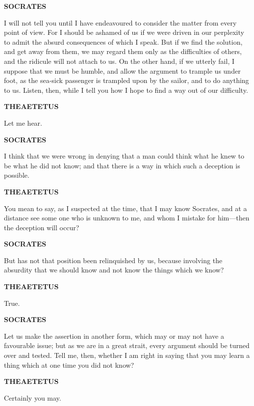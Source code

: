 \documentclass[11pt,letter]{article}
\begin{document}
\par \textbf{SOCRATES}
\par   I will not tell you until I have endeavoured to consider the matter from every point of view. For I should be ashamed of us if we were driven in our perplexity to admit the absurd consequences of which I speak. But if we find the solution, and get away from them, we may regard them only as the difficulties of others, and the ridicule will not attach to us. On the other hand, if we utterly fail, I suppose that we must be humble, and allow the argument to trample us under foot, as the sea-sick passenger is trampled upon by the sailor, and to do anything to us. Listen, then, while I tell you how I hope to find a way out of our difficulty.

\par \textbf{THEAETETUS}
\par   Let me hear.

\par \textbf{SOCRATES}
\par   I think that we were wrong in denying that a man could think what he knew to be what he did not know; and that there is a way in which such a deception is possible.

\par \textbf{THEAETETUS}
\par   You mean to say, as I suspected at the time, that I may know Socrates, and at a distance see some one who is unknown to me, and whom I mistake for him—then the deception will occur?

\par \textbf{SOCRATES}
\par   But has not that position been relinquished by us, because involving the absurdity that we should know and not know the things which we know?

\par \textbf{THEAETETUS}
\par   True.

\par \textbf{SOCRATES}
\par   Let us make the assertion in another form, which may or may not have a favourable issue; but as we are in a great strait, every argument should be turned over and tested. Tell me, then, whether I am right in saying that you may learn a thing which at one time you did not know?

\par \textbf{THEAETETUS}
\par   Certainly you may.
\end{document}
